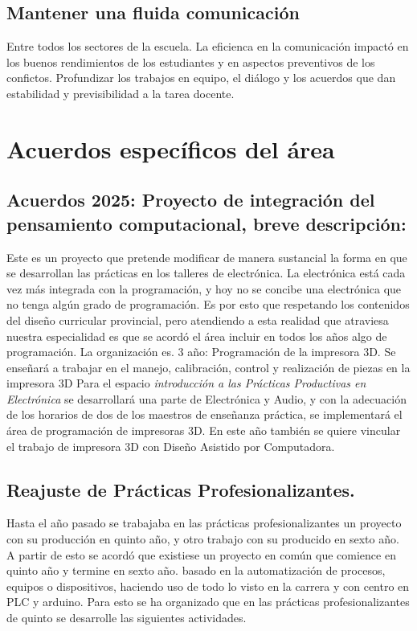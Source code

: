 \documentclass[../main]{subfiles}
\begin{document}
\subsection{Mantener una fluida comunicación}
Entre todos los sectores de la escuela.  La eficienca en la comunicación impactó en los buenos rendimientos de los estudiantes y en aspectos preventivos de los confictos.
Profundizar los trabajos en equipo, el diálogo y los acuerdos que dan estabilidad y previsibilidad a la tarea docente.
\section{Acuerdos específicos del área}
\subsection{Acuerdos 2025: Proyecto de integración del pensamiento computacional, breve descripción:}
Este es un proyecto que pretende modificar de manera sustancial la forma en que se desarrollan las prácticas en los talleres de electrónica. La electrónica está cada vez más integrada con la programación, y hoy no se concibe una electrónica que no tenga algún grado de programación. Es por esto que respetando los contenidos del diseño curricular provincial, pero atendiendo a esta realidad que atraviesa nuestra especialidad es que se acordó el área incluir en todos los años algo de programación. La organización es.
3 año: Programación de la impresora 3D. Se enseñará a trabajar en el manejo, calibración, control y realización de piezas en la impresora 3D Para el espacio \emph{introducción a las Prácticas Productivas en Electrónica} se desarrollará una parte de Electrónica y Audio, y con la adecuación de los horarios de dos de los maestros de enseñanza práctica, se implementará el área de programación de impresoras 3D. En este año también se quiere vincular el trabajo de impresora 3D con Diseño Asistido por Computadora.
\subsection{Reajuste de Prácticas Profesionalizantes.}
Hasta el año pasado se trabajaba en las prácticas profesionalizantes un proyecto con su producción en quinto año, y otro trabajo con su producido en sexto año. A partir de esto se acordó que existiese un proyecto en común que comience en quinto año y termine en sexto año. basado en la automatización de procesos, equipos o dispositivos, haciendo uso de todo lo visto en la carrera y con centro en PLC y arduino. Para esto se ha organizado que en las prácticas profesionalizantes de quinto se desarrolle las siguientes actividades.
\end{document}
